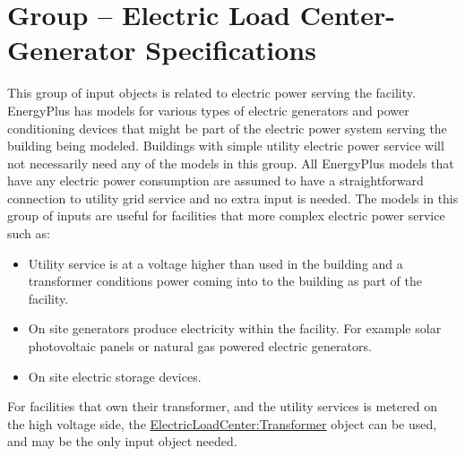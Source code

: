 \section{Group -- Electric Load Center-Generator Specifications}\label{group-electric-load-center-generator-specifications}

This group of input objects is related to electric power serving the facility. EnergyPlus has models for various types of electric generators and power conditioning devices that might be part of the electric power system serving the building being modeled. Buildings with simple utility electric power service will not necessarily need any of the models in this group. All EnergyPlus models that have any electric power consumption are assumed to have a straightforward connection to utility grid service and no extra input is needed. The models in this group of inputs are useful for facilities that more complex electric power service such as:

\begin{itemize}
\tightlist
\item
  Utility service is at a voltage higher than used in the building and a transformer conditions power coming into to the building as part of the facility.
\item
  On site generators produce electricity within the facility. For example solar photovoltaic panels or natural gas powered electric generators.
\item
  On site electric storage devices.
\end{itemize}

For facilities that own their transformer, and the utility services is metered on the high voltage side, the \hyperref[electricloadcentertransformer]{ElectricLoadCenter:Transformer} object can be used, and may be the only input object needed.

